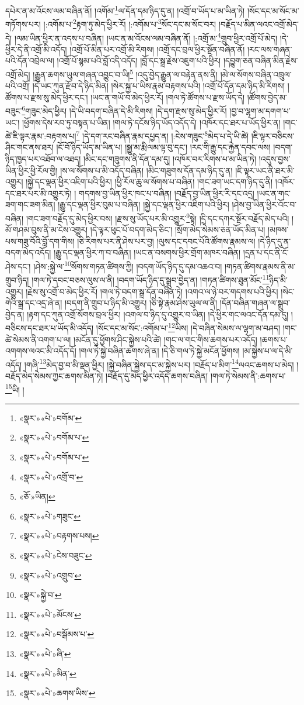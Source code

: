 དཔེར་ན་མ་འོངས་ལམ་བཞིན་ནོ། །འགོམ་\footnote{«སྣར་»«པེ་»བགོམ་}ལ་དོན་དམ་ཉིད་དུ་ན། །འགྲོ་བ་ཡོད་པ་མ་ཡིན་ཏེ། །སོང་དང་མ་སོང་མ་གཏོགས་པར། །:འགོམ་པ་\footnote{«སྣར་»«པེ་»བགོམ་པ་}རྟག་ཏུ་མེད་ཕྱིར་རོ། །:འགོམ་པ་\footnote{«སྣར་»«པེ་»བགོམ་པ་}སོང་དང་མ་སོང་བར། །བརྗོད་པ་མིན་ལའང་འགྲོ་མེད་དེ། །ལམ་ཡིན་ཕྱིར་ན་འདས་པ་བཞིན། །ཡང་ན་མ་འོངས་ལམ་བཞིན་ནོ། །:འགྲོ་མ་\footnote{«སྣར་»«པེ་»འགྲོ་བ་}གྲུབ་ཕྱིར་འགྲོ་པོ་མེད། །དེ་ཕྱིར་དེ་ནི་འགྲོ་མི་འདོད། །འགྲོ་པོ་མིན་པར་འགྲོ་མི་རིགས། །འགྲོ་དང་བྲལ་ཕྱིར་སྔོན་བཞིན་ནོ། །རང་ལས་གཞན་པའི་དོན་འབྲེལ་ལ། །འགྲོ་པོ་སྙམ་པའི་བློ་འདི་འདོད། །བློ་དང་སྒྲ་རྗེས་འཇུག་པའི་ཕྱིར། །དབྱུག་ཅན་བཞིན་མིན་རྗེས་འགྲོ་མེད། །རྒྱུན་ཆགས་ཡུལ་གཞན་འབྱུང་བ་ཡི།\footnote{«ཅོ་»ཡིན།} །འདུ་བྱེད་རྒྱུན་ལ་བརྟེན་ནས་ནི། །མེ་ལ་སོགས་བཞིན་འཁྲུལ་པའི་འགྲོ། །དེ་ཡང་ཀུན་རྫོབ་དེ་ཉིད་མིན། །སེར་སྐྱ་པ་ཡིས་རྣམ་བརྟགས་པའི། །འགྲོ་པོ་དོན་དམ་ཉིད་མི་རིགས། །ཚོགས་པ་རྫས་སུ་མེད་ཕྱིར་དང་། །ཡང་ན་གཡོ་བ་མེད་ཕྱིར་རོ། །གལ་ཏེ་ཚོགས་པ་རྫས་ཡོད་དེ། །ཚོགས་བྱེད་མ་བཟུང་\footnote{«སྣར་»«པེ་»གཟུང་}གཟུང་མེད་ཕྱིར། །དེ་ཡི་བདག་བཞིན་དེ་མི་རིགས། །དེ་དག་རྫས་སུ་མེད་ཕྱིར་རོ། །བྱ་བ་ལྷག་མ་དགག་པ་ཡང་། །ཕྱོགས་དེས་རབ་ཏུ་བསྟན་པ་ཡིན། །གལ་ཏེ་དངོས་ཉིད་ཡོད་འདོད་དེ། །འཁོར་དང་ཐར་པ་ཡོད་ཕྱིར་ན། །གང་ཚེ་ཇི་ལྟར་རྣམ་:བརྟགས་པ།\footnote{«སྣར་»«པེ་»བརྟགས་པས།} །དེ་དག་རང་བཞིན་རྣམ་དཔྱད་ན། །:ངེས་གཟུང་\footnote{«སྣར་»«པེ་»ངེས་བཟུང་}མེད་པ་དེ་ཡི་ཚེ། །ཇི་ལྟར་བཅིངས་ཤིང་གང་ནས་ཐར། །ངོ་བོ་ཉིད་ཡོད་མ་ཡིན་པ། །སྒྱུ་མ་རྨི་ལམ་ལྟ་བུ་དང་། །རང་གི་རྒྱུ་དང་རྐྱེན་དབང་ལས། །བདག་ཉིད་ཁྱད་པར་འཐོབ་ལ་འཐད། །མིང་དང་གཟུགས་ནི་དོན་དམ་དུ། །འཁོར་བར་རིགས་པ་མ་ཡིན་ཏེ། །འདུས་བྱས་ཡིན་ཕྱིར་ཕྱི་རོལ་གྱི། །ས་ལ་སོགས་པ་མི་འདོད་བཞིན། །མིང་གཟུགས་དོན་དམ་ཉིད་དུ་ན། །ཇི་ལྟར་ཡང་ནི་ཐར་མི་འགྱུར། །སྐྱེ་དང་ལྡན་ཕྱིར་འཇིག་པའི་ཕྱིར། །ཕྱི་རོལ་ཆུ་ལ་སོགས་པ་བཞིན། །གང་ཟག་ཡང་དག་ཉིད་དུ་ནི། །འཁོར་དང་ཐར་པར་མི་འགྱུར་ཏེ། །
གདགས་བྱ་ཡིན་ཕྱིར་ཁང་པ་བཞིན། །བརྗོད་བྱ་ཡིན་ཕྱིར་རི་དང་འདྲ། །ཡང་ན་གང་ཟག་གང་ཟག་མིན། །རྒྱུ་དང་ལྡན་ཕྱིར་བུམ་པ་བཞིན། །སྐྱེ་དང་ལྡན་ཕྱིར་འཇིག་པའི་ཕྱིར། །ཤེས་བྱ་ཡིན་ཕྱིར་འོང་བ་བཞིན། །གང་ཟག་བརྗོད་དུ་མེད་ཕྱིར་བས། །རྫས་སུ་ཡོད་པར་མི་འགྱུར་\footnote{«སྣར་»«པེ་»འགྲུབ་}སྟེ། །དྲི་དང་དཀར་སྔོར་བརྗོད་མེད་པའི། །མོ་གཤམ་བུས་ནི་མ་ངེས་འགྱུར། །དེ་ལྟར་ཕུང་པོ་བདག་མེད་ཅིང་། །སྲོག་མེད་སེམས་ཅན་ཡོད་མིན་པ། །མཁས་པས་གཟུ་བོའི་བློ་དག་གིས། །ཅི་རིགས་པར་ནི་ཤེས་པར་བྱ། །ལུས་དང་དབང་པོའི་ཚོགས་རྣམས་ལ། །དེ་ཉིད་དུ་ན་བདག་མེད་འདོད། །རྒྱུ་དང་ལྡན་ཕྱིར་ཀ་བ་བཞིན། །ཡང་ན་བསགས་ཕྱིར་གྲོག་མཁར་བཞིན། །དྲན་པ་དང་ནི་ངོ་ཤེས་དང་། །ཤེས་:སྐྱེ་ལ་\footnote{«སྣར་»སྐྱེ་བ་}སོགས་གཏན་ཚིགས་ཀྱི། །བདག་ཡོད་ཉིད་དུ་དམ་འཆའ་བ། །གཏན་ཚིགས་རྣམས་ནི་མ་གྲུབ་ཉིད། །གལ་ཏེ་དབང་བཅས་ལུས་ལ་ནི། །བདག་ཡོད་ཉིད་དུ་སྒྲུབ་བྱེད་ན། །གཏན་ཚིགས་ཐུན་མོང་\footnote{«སྣར་»«པེ་»མོངས་}ཉིད་མི་འགྱུར། །རྗེས་སུ་འགྲོ་བ་མེད་ཕྱིར་རོ། །གལ་ཏེ་བདག་སྒྲ་དོན་བཞིན་ཏེ། །འགའ་ལ་ཉེ་བར་གདགས་པའི་ཕྱིར། །སེང་གེའི་སྒྲ་དང་འདྲ་ཞེ་ན། །བདག་ནི་གྲུབ་པ་ཉིད་མི་འགྱུར། །ཅི་སྟེ་རྣམ་ཤེས་ཡུལ་ལ་ནི། །དོན་བཞིན་གཞན་ལ་སྒྲུབ་བྱེད་ན། །རྟག་དང་ཀུན་འགྲོ་སོགས་བྲལ་ཕྱིར། །འགལ་བ་ཉིད་དུ་འགྱུར་བ་ཡིན། །དེ་ཕྱིར་གང་ལའང་དོན་དམ་དུ། །བཅིངས་དང་ཐར་པ་ཡོད་མི་འདོད། །སོང་དང་མ་སོང་:འགོམ་པ་\footnote{«སྣར་»«པེ་»བསྒོམས་པ་}ཡིས། །དེ་བཞིན་སེམས་ལ་ལྷག་མ་བཤད། །གང་ཚེ་སེམས་ནི་འགག་པ་ལ། །མངོན་དུ་ཕྱོགས་ཤིང་སྐྱེས་པའི་ཚེ། །གང་ལ་གང་གིས་ཆགས་པར་འདོད། །ཆགས་པ་འགགས་ལའང་མི་འདོད་དོ། །གལ་ཏེ་སྐྱེ་བཞིན་ཆགས་ཞེ་ན། །དེ་ཅི་གལ་ཏེ་སྐྱེ་མངོན་ཕྱོགས། །མ་སྐྱེས་པ་ལ་དེ་མི་འདོད། །གཞི་\footnote{«སྣར་»«པེ་»ཞི་}མེད་བྱ་བ་མི་ལྡན་ཕྱིར། །སྐྱེ་བཞིན་སྐྱེས་དང་མ་སྐྱེས་པར། །བརྗོད་པ་མིག་\footnote{«སྣར་»«པེ་»མིན་}ལའང་ཆགས་པ་མེད། །བརྗོད་མེད་སེམས་ཀྱང་ཆགས་མིན་ཏེ། །བརྗོད་དུ་མེད་ཕྱིར་འདོད་ཆགས་བཞིན། །གལ་ཏེ་སེམས་ནི་:ཆགས་པ་\footnote{«སྣར་»«པེ་»ཆགས་ཡིས་}ཡི། །

